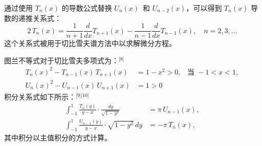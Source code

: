 通过使用 $T_n(x)$ 的导数公式替换 $U_n(x)$  和 $U_{n-2}(x)$，可以得到 $T_n(x)$ 导数的递推关系式：
$$
2\,T_n(x) = \frac{1}{n+1} \frac{d}{dx} T_{n+1}(x) - \frac{1}{n-1} \frac{d}{dx} T_{n-1}(x), \quad n = 2, 3, \ldots~
$$
这个关系式被用于切比雪夫谱方法中以求解微分方程。

图兰不等式对于切比雪夫多项式为：\(^\text{[8]}\)
$$
\begin{aligned}
T_n(x)^2 - T_{n-1}(x)\,T_{n+1}(x) &= 1 - x^2 > 0, & \text{当 } -1 < x < 1, \\
U_n(x)^2 - U_{n-1}(x)\,U_{n+1}(x) &= 1 > 0
\end{aligned}~
$$
积分关系式如下所示：\(^\text{[9][10]}\)
$$
\begin{aligned}
\int_{-1}^{1} \frac{T_n(y)}{y - x} \cdot \frac{dy}{\sqrt{1 - y^2}} &= \pi\, U_{n-1}(x), \\
\int_{-1}^{1} \frac{U_{n-1}(y)}{y - x} \cdot \sqrt{1 - y^2}\,dy &= -\pi\, T_n(x),
\end{aligned}~
$$
其中积分以主值积分的方式计算。
